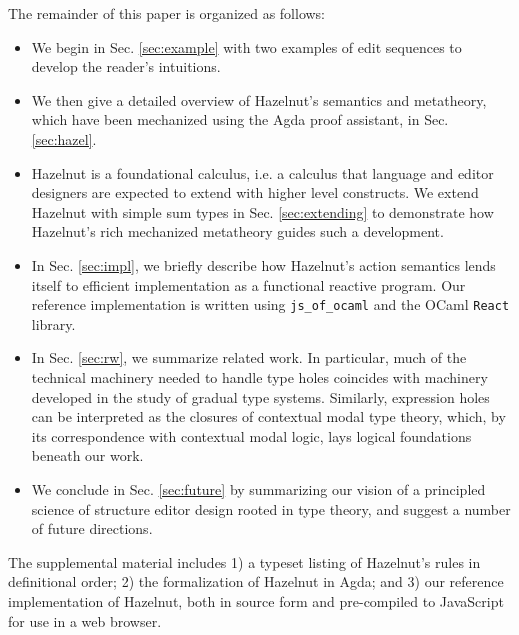 The remainder of this paper is organized as follows:
\begin{itemize}[itemsep=0px,partopsep=2px,topsep=2px]
\item We begin in Sec. 
    \ref{sec:example} with two examples of edit sequences to develop the reader's intuitions.  
\item We then give a detailed overview of Hazelnut's semantics and metatheory, which have been mechanized using the Agda proof assistant, in Sec.  \ref{sec:hazel}.
\item Hazelnut is a {foundational} calculus, i.e. a calculus that language and editor designers are expected to extend with higher level constructs. We extend Hazelnut with simple sum types in Sec.  \ref{sec:extending} to demonstrate how Hazelnut's rich mechanized metatheory guides such a development. 
\item In Sec.  \ref{sec:impl}, we briefly describe how Hazelnut's action semantics lends itself to efficient implementation as a functional reactive program. Our reference implementation is written using \lstinline{js_of_ocaml} and the OCaml \lstinline{React} library.
 

\item In Sec.  \ref{sec:rw}, we summarize related work. In particular, much of the technical machinery needed to handle type holes coincides with machinery developed in the study of gradual type systems. Similarly, expression holes can be interpreted as the closures of contextual modal type theory, which, by its correspondence with contextual modal logic, lays logical foundations beneath our work. %

\item We conclude in Sec.  \ref{sec:future} by summarizing our vision of a principled science of structure editor design rooted in type theory, and suggest a number of future directions.
\end{itemize} 
The supplemental material includes 1) a typeset listing of Hazelnut's rules in definitional order; 2) the formalization of Hazelnut in Agda; and 3) our reference implementation of Hazelnut, both in source form and pre-compiled to JavaScript for use in a web browser.